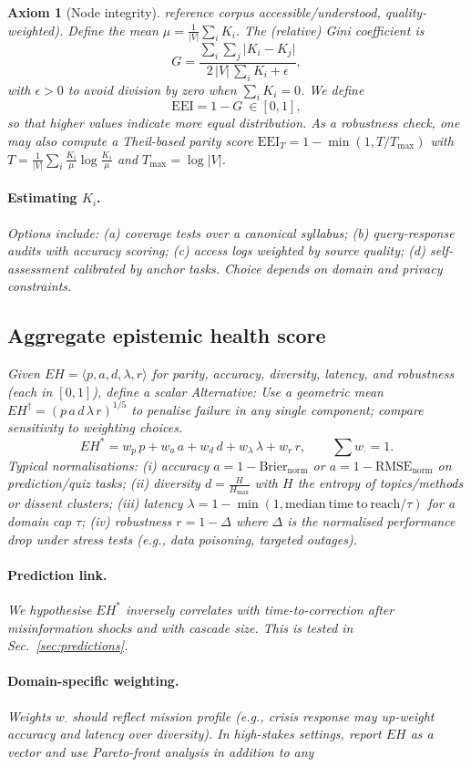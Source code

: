 \documentclass[12pt]{article}
\newtheorem{axiom}{Axiom}
\begin{document}
\begin{axiom}[Node integrity]
reference corpus accessible/understood, quality-weighted). Define the mean $\mu=\frac{1}{|V|}\sum_{i} K_i$. The (relative) Gini coefficient is \begin{equation} G=\frac{\sum_{i}\sum_{j}\lvert K_i-K_j\rvert}{2\,|V|\,\sum_{i} K_i+\epsilon}, \end{equation} with $\epsilon\!>\!0$ to avoid division by zero when $\sum_i K_i=0$. We define \begin{equation} \mathrm{EEI}=1-G\ \in[0,1], \end{equation} so that higher values indicate more equal distribution. As a robustness check, one may also compute a Theil-based parity score $\mathrm{EEI}_T=1-\min(1,T/T_{\max})$ with $T=\frac{1}{|V|}\sum_i \frac{K_i}{\mu}\log\frac{K_i}{\mu}$ and $T_{\max}=\log |V|$. \paragraph{Estimating $K_i$.} Options include: (a) coverage tests over a canonical syllabus; (b) query-response audits with accuracy scoring; (c) access logs weighted by source quality; (d) self-assessment calibrated by anchor tasks. Choice depends on domain and privacy constraints. \subsection{Aggregate epistemic health score} Given $EH=\langle p,a,d,\lambda,r\rangle$ for parity, accuracy, diversity, latency, and robustness (each in $[0,1]$), define a scalar \emph{Alternative:} Use a geometric mean $EH^{\dagger}=(p\,a\,d\,\lambda\,r)^{1/5}$ to penalise failure in any single component; compare sensitivity to weighting choices. \begin{equation} EH^{\ast}=w_p\,p+w_a\,a+w_d\,d+w_\lambda\,\lambda+w_r\,r,\qquad \sum w_{\cdot}=1. \end{equation} Typical normalisations: (i) \emph{accuracy} $a=1-\mathrm{Brier}_{\mathrm{norm}}$ or $a=1-\mathrm{RMSE}_{\mathrm{norm}}$ on prediction/quiz tasks; (ii) \emph{diversity} $d=\frac{H}{H_{\max}}$ with $H$ the entropy of topics/methods or dissent clusters; (iii) \emph{latency} $\lambda=1-\min(1,\mathrm{median\ time\ to\ reach}/\tau)$ for a domain cap $\tau$; (iv) \emph{robustness} $r=1-\Delta$ where $\Delta$ is the normalised performance drop under stress tests (e.g., data poisoning, targeted outages). \paragraph{Prediction link.} We hypothesise $EH^{\ast}$ inversely correlates with time-to-correction after misinformation shocks and with cascade size. This is tested in Sec.~\ref{sec:predictions}. \paragraph{Domain-specific weighting.} Weights $w_{\cdot}$ should reflect mission profile (e.g., crisis response may up-weight accuracy and latency over diversity). In high-stakes settings, report $EH$ as a \emph{vector} and use Pareto-front analysis in addition to any 
\end{axiom}
\end{document}
